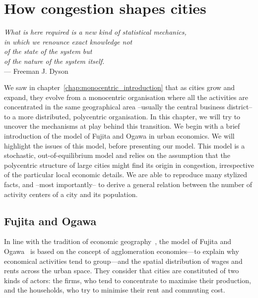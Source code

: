 \chapter{How congestion shapes cities}
\label{chap:monocentric_model}

\begin{flushright}{\slshape    
What is here required is a new kind of statistical mechanics,\\
in which we renounce exact knowledge not\\
of the state of the system but\\
of the nature of the system itself.}  \\ \medskip
--- Freeman J. Dyson~\cite{Dyson:1962}
\end{flushright}


\bigskip


We saw in chapter~\ref{chap:monocentric_introduction} that as cities grow and
expand, they evolve from a monocentric organisation where all the activities are
concentrated in the same geographical area --usually the central business
district-- to a more distributed, polycentric organisation. In this chapter, we
will try to uncover the mechanisms at play behind this transition. We begin with
a brief introduction of the model of Fujita and Ogawa in urban economics. We
will highlight the issues of this model, before presenting our model. This model
is a stochastic, out-of-equilibrium model and relies on the assumption that the
polycentric structure of large cities might find its origin in congestion,
irrespective of the particular local economic details. We are able to reproduce
many stylized facts, and --most importantly-- to derive a general relation
between the number of activity centers of a city and its population. 


\section{Fujita and Ogawa}
\label{sec:fujita_and_ogawa}

In line with the tradition of economic geography~\cite{Fujita:2001}, the model
of Fujita and Ogawa~\cite{Fujita:1982} is based on the concept of agglomeration
economies---to explain why economical activities tend to group---and the spatial
distribution of wages and rents across the urban space. They consider that
cities are constituted of two kinds of actors: the firms, who tend to
concentrate to maximise their production, and the households, who try to
minimise their rent and commuting cost.\\ 

